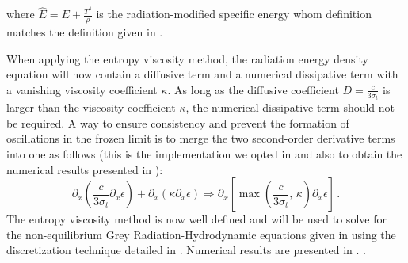 \documentclass[times]{fldauth}
\begin{document}
%
where $\hat{E} = E + \frac{T^4}{\rho} $ is the radiation-modified specific energy whom definition matches the definition given in \cite{LowrieMorel}.

When applying the entropy viscosity method, the radiation energy density equation will now contain a diffusive term and a numerical dissipative term with a vanishing viscosity coefficient $\kappa$. As long as the diffusive coefficient $D=\frac{c}{3 \sigma_t}$ is larger than the viscosity coefficient $\kappa$, the numerical dissipative term should not be required. A way to ensure consistency and prevent the formation of oscillations in the frozen limit is to merge the two second-order derivative terms into one as follows (this is the implementation we opted in \cite{our_jcp_radhy_paper} and also to obtain the numerical results presented in ):
%
\begin{equation}
 \partial_x \left( \frac{c}{3 \sigma_t} \partial_x \epsilon \right) + \partial_x \left( \kappa \partial_x \epsilon \right) 
 \Longrightarrow
 \partial_x \left[ \max\left(\frac{c}{3 \sigma_t} \text{, } \kappa \right) \partial_x \epsilon \right] \,.
\end{equation}
%
The entropy viscosity method is now well defined and will be used to solve for the non-equilibrium Grey Radiation-Hydrodynamic equations given in  using the discretization technique detailed in . Numerical results are presented in .  .
\end{document}
